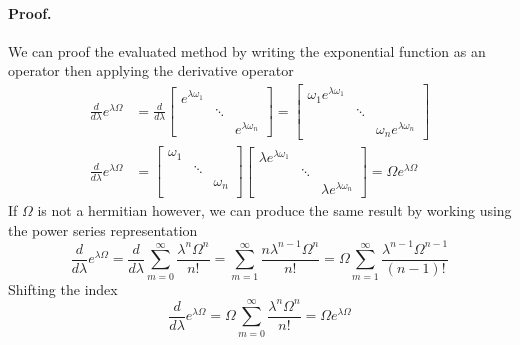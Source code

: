 \documentclass[../main.tex]{subfiles}
\begin{document}
\paragraph*{Proof.} We can proof the evaluated method by writing the exponential function as an operator then applying the derivative operator
\begin{align*}
	\frac{d }{d\lambda}e^{\lambda\Omega}&=\frac{d }{d\lambda}
	\begin{bmatrix}
		e^{\lambda\omega_1} &        &            \\
		           & \ddots &            \\
		           &        & e^{\lambda\omega_n}
	\end{bmatrix}
	=
	\begin{bmatrix}
		\omega_1 e^{\lambda\omega_1} &        &            \\
		           & \ddots &            \\
		           &        & \omega_n e^{\lambda\omega_n}
	\end{bmatrix}\\
	\frac{d }{d\lambda }e^{\lambda\Omega}&=
	\begin{bmatrix}
		\omega_1&&\\
		&\ddots&\\
		&&\omega_n\\
	\end{bmatrix}
	\begin{bmatrix}
		\lambda e^{\lambda\omega_1} &        &            \\
		           & \ddots &            \\
		           &        & \lambda e^{\lambda\omega_n}
	\end{bmatrix}
	=\Omega e^{\lambda \Omega}
\end{align*}  
If $\Omega$ is not a hermitian however, we can produce the same result by working using the power series representation
\begin{equation*}
	\frac{d }{d\lambda }e^{\lambda\Omega}=\frac{d }{d\lambda} \sum_{m=0 }^{\infty }\frac{\lambda^n\Omega^n }{n! }= \sum_{m=1 }^{\infty }\frac{n\lambda^{n-1 }\Omega^{n}}{n!}=\Omega\sum_{m=1 }^{\infty}\frac{\lambda^{n-1} \Omega^{n-1}}{(n-1)!}
\end{equation*}
Shifting the index 
\begin{equation*}
	\frac{d }{d\lambda }e^{\lambda \Omega}=\Omega\sum_{m=0 }^{\infty}\frac{\lambda^n \Omega^n }{n!}=\Omega e^{\lambda\Omega}
\end{equation*}
\end{document}
